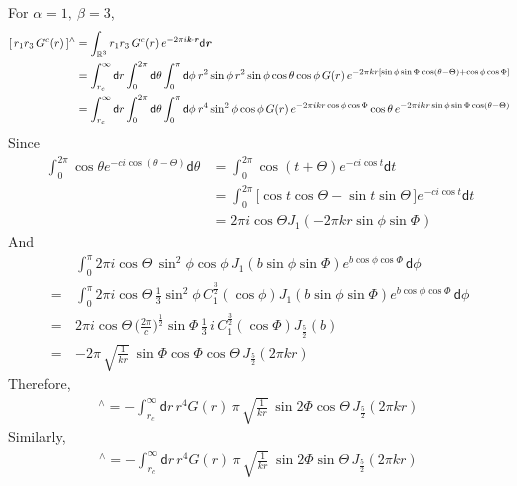 \documentclass[aps,pre,preprint,unsortedaddress]{revtex4}
\renewcommand{\v}[1]{\textbf{\textit{#1}}}
\renewcommand{\d}[1]{\textsf{#1}}
\begin{document}
For $\alpha = 1,\ \beta = 3$,
\begin{align}\nonumber
  [\,r_1 r_3\,G^c(r)\,]^{\wedge} 
  &= \int_{\mathbb R^3} r_1 r_3\,G^c(r)\, e^{-2\pi i\v k\cdot\v r}\d d\v r \\\nonumber
  &= \int_{r_c}^\infty \d dr \int_{0}^{2\pi} \d d\theta \int_0^\pi\d d\phi\:
  r^2\sin\phi \,r^2 \sin\phi\cos\theta\cos\phi  \,G(r)\,
  e^{-2\pi k r[\sin\phi\sin\Phi\cos(\theta - \Theta) + \cos\phi\cos\Phi]} \\
  &= \int_{r_c}^\infty \d dr \int_{0}^{2\pi} \d d\theta \int_0^\pi\d d\phi\:
  r^4\sin^2\phi\cos\phi\,G(r)\,e^{-2\pi i kr\cos\phi\cos\Phi}
  \cos\theta\,e^{-2\pi i kr\sin\phi\sin\Phi\cos(\theta- \Theta)}
\end{align}
Since
\begin{align}\nonumber
  \int_0^{2\pi}\cos\theta e^{-c i\cos(\theta - \Theta)} \d d\theta
  &=
  \int_0^{2\pi}\cos(t+\Theta) e^{-c i\cos t} \d d t\\\nonumber
  & =
  \int_0^{2\pi}
  \big[
   \cos t\cos \Theta - \sin t\sin \Theta
  \,\big]
  e^{-c i\cos t} \d dt \\\nonumber
  &=
  2\pi i  \cos \Theta J_1(-2\pi kr\sin\phi\sin\Phi)
\end{align}
And
\begin{align}\nonumber
  &
  \int_0^\pi
  2\pi i \cos \Theta\,
  \sin^2\phi\cos\phi\,
  J_1(b\sin\phi\sin\Phi) e^{b\cos\phi\cos\Phi} \,\d d\phi \\\nonumber
  = \,&
  \int_0^\pi
  2\pi i \cos \Theta\,
  \frac13\sin^2\phi\, C_1^{\frac32}(\cos\phi)
  J_1(b\sin\phi\sin\Phi) e^{b\cos\phi\cos\Phi} \,\d d\phi \\\nonumber
  = \,&
  2\pi i \cos \Theta\,
  \big(
  \frac{2\pi}{c}
  \big)^{\frac12}
  \sin\Phi\, \frac 13\,i\, C_1^{\frac32}(\cos\Phi)
  J_{\frac52}(b) \\\nonumber
  = \,&
  -2 \pi\,
  \sqrt{\frac1{kr}}\:
  \sin\Phi\cos\Phi\cos\Theta \,J_{\frac52}(2\pi kr) 
\end{align}
Therefore,
\begin{align}
  [\,r_1 r_3\,G^c(r)\,]^{\wedge} 
  =
  -\int_{r_c}^\infty
  \d dr\,
  r^4G(r)\,\pi\,
  \sqrt{\frac1{kr}}\:
  \sin2\Phi\cos\Theta\,J_{\frac52}(2\pi kr)\,
\end{align}
Similarly,
\begin{align}
  [\,r_2 r_3\,G^c(r)\,]^{\wedge} 
  =
  -\int_{r_c}^\infty
  \d dr\,
  r^4G(r)\,\pi\,
  \sqrt{\frac1{kr}}\:
  \sin2\Phi\sin\Theta\,J_{\frac52}(2\pi kr)\,
\end{align}
\end{document}
